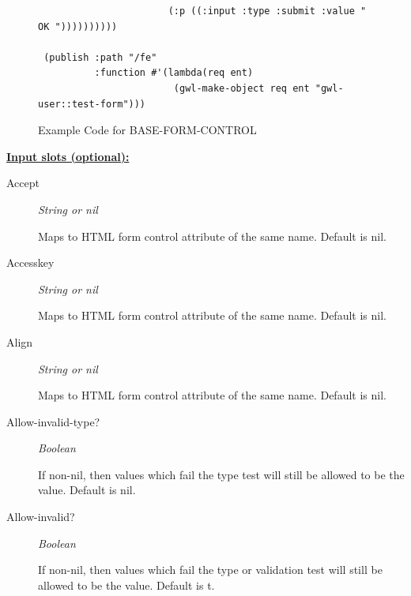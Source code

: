 \documentclass [11pt]{book}
\begin{document}
\begin{itemize}
\begin{figure}
\begin{lrbox}{\boxedverb}
\begin{minipage}{\linewidth}
{\begin{verbatim}
                       (:p ((:input :type :submit :value " OK "))))))))))
 
 (publish :path "/fe"
          :function #'(lambda(req ent)
                        (gwl-make-object req ent "gwl-user::test-form")))

\end{verbatim}}
\end{minipage}
\end{lrbox}
\fbox{\usebox{\boxedverb}}

\caption{Example Code for BASE-FORM-CONTROL}

\label{fig:example-code-BASE-FORM-CONTROL}

\end{figure}





\textbf{
\underline{Input slots (optional):}}

\begin{description}

\item [Accept]
\emph{String or nil}

 Maps to HTML form control attribute of the same name. Default is nil.




\item [Accesskey]
\emph{String or nil}

 Maps to HTML form control attribute of the same name. Default is nil.




\item [Align]
\emph{String or nil}

 Maps to HTML form control attribute of the same name. Default is nil.




\item [Allow-invalid-type?]
\emph{Boolean}

 If non-nil, then values which fail the type test will still be allowed to be the value. Default is nil.




\item [Allow-invalid?]
\emph{Boolean}

 If non-nil, then values which fail the type or validation test will still be allowed to be the value. Default is t.





\end{description}
\end{itemize}
\end{document}
